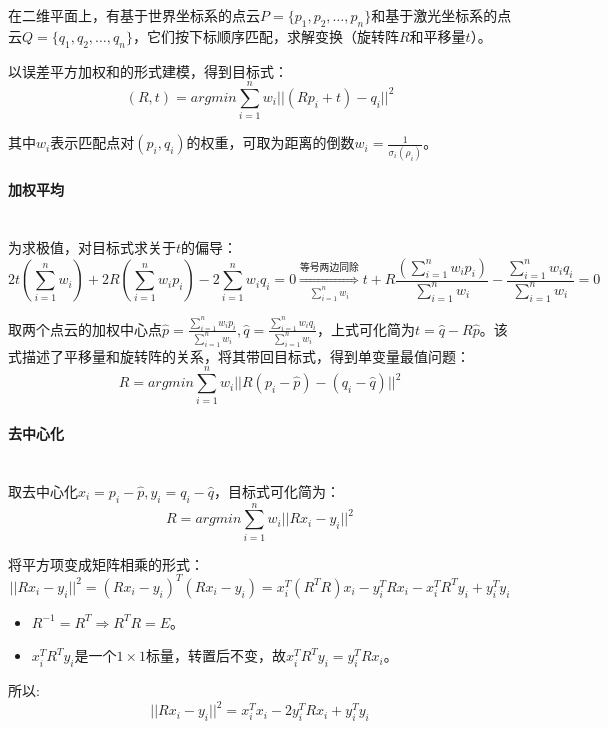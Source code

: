 \documentclass[
12pt, %
a4paper, 
oneside, %
headinclude,footinclude, %
]{scrartcl}
\begin{document}
在二维平面上，有基于世界坐标系的点云$ P = \{p_1, p_2, \dots, p_n\} $和基于激光坐标系的点云$ Q = \{q_1, q_2, \dots, q_n\} $，它们按下标顺序匹配，求解变换（旋转阵$ R $和平移量$ t $）。

以误差平方加权和的形式建模，得到目标式：
$$ (R, t) = argmin \sum_{i = 1}^{n}w_i ||(R p_i + t) - q_i||^2 $$

其中$ w_i $表示匹配点对$ (p_i, q_i) $的权重，可取为距离的倒数$ w_i = \frac{1}{\sigma_i(\rho_i)} $。
\paragraph{加权平均}~\\

为求极值，对目标式求关于$ t $的偏导：
$$ 
2t(\sum_{i = 1}^{n} w_i) + 2R(\sum_{i = 1}^{n} w_i p_i) - 2\sum_{i = 1}^{n} w_i q_i = 0 
\overset{\text{等号两边同除}}{\underset{\sum_{i = 1}^{n} w_i}{\Longrightarrow}}
t + R\frac{(\sum_{i = 1}^{n} w_i p_i)}{\sum_{i = 1}^{n} w_i} - \frac{\sum_{i = 1}^{n} w_i q_i}{\sum_{i = 1}^{n} w_i} = 0
$$

取两个点云的加权中心点$ \hat{p} = \frac{\sum_{i = 1}^{n} w_i p_i}{\sum_{i = 1}^{n} w_i}, \hat{q} = \frac{\sum_{i = 1}^{n} w_i q_i}{\sum_{i = 1}^{n} w_i} $，上式可化简为$ t = \hat{q} - R \hat{p} $。该式描述了平移量和旋转阵的关系，将其带回目标式，得到单变量最值问题：
$$ R = argmin \sum_{i = 1}^{n}w_i ||R(p_i - \hat{p}) - (q_i - \hat{q})||^2 $$
\paragraph{去中心化}~\\

取去中心化$ x_i = p_i - \hat{p}, y_i = q_i - \hat{q} $，目标式可化简为：
$$ R = argmin \sum_{i = 1}^{n}w_i ||R x_i - y_i||^2 $$

将平方项变成矩阵相乘的形式：
$$ ||Rx_i - y_i||^2 = (R x_i - y_i)^T(R x_i - y_i) = x_i^T (R^T R) x_i - y_i^T R x_i - x_i^T R^T y_i + y_i^T y_i $$
\begin{itemize}
\item $ R^{-1} = R^T \Rightarrow R^T R = E $。
\item $ x_i^T R^T y_i $是一个$ 1 \times 1 $标量，转置后不变，故$ x_i^T R^T y_i = y_i^T R x_i $。
\end{itemize}

所以:
$$ ||Rx_i - y_i||^2 = x_i^T x_i - 2 y_i^T R x_i + y_i^T y_i $$
\end{document}
